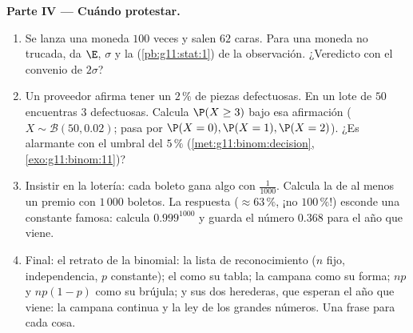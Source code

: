 \begin{problem}
\medskip
\noindent\textbf{Parte IV --- Cuándo protestar.}
\begin{enumerate}[resume]
  \item Se lanza una moneda $100$ veces y salen $62$ caras. Para una
        moneda no trucada, da $\E$, $\sigma$ y la 
        (\cref{pb:g11:stat:1}) de la observación. ¿Veredicto con el
        convenio de $2\sigma$?
  \item Un proveedor afirma tener un $2\,\%$ de piezas defectuosas. En un
        lote de $50$ encuentras $3$ defectuosas. Calcula $\P(X \geq 3)$
        bajo esa afirmación ($X \sim \mathcal B(50, 0.02)$; pasa por
        $\P(X = 0), \P(X = 1), \P(X = 2)$). ¿Es alarmante con el umbral
        del $5\,\%$ (\cref{met:g11:binom:decision},
        \cref{exo:g11:binom:11})?
  \item Insistir en la lotería: cada boleto gana algo con 
        $\frac{1}{1000}$. Calcula la  de al menos un premio
        con $1\,000$ boletos. La respuesta ($\approx 63\,\%$, ¡no
        $100\,\%$!) esconde una constante famosa: calcula $0.999^{1000}$ y
        guarda el número $0.368$ para el año que viene.
  \item Final: el retrato de la binomial: la lista de reconocimiento ($n$
        fijo, independencia, $p$ constante); el  como
        su tabla; la campana como su forma; $np$ y $np(1-p)$ como su
        brújula; y sus dos herederas, que esperan el año que viene: la
        campana continua y la ley de los grandes números. Una frase para
        cada cosa.
\end{enumerate}
\end{problem}
